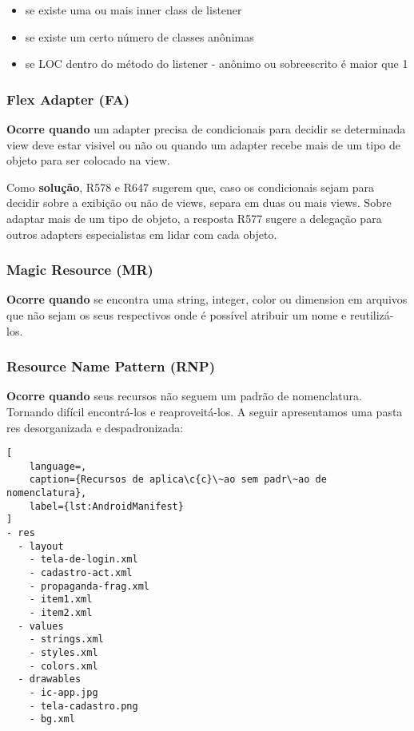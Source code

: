 \begin{itemize} 
	\item[$\circ$] [n\'ivel 4] se existe uma ou mais inner class de listener
	\item[$\circ$] [n\'ivel 3] se existe um certo n\'umero de classes an\^onimas
	\item[$\circ$] [n\'ivel 2 e 3] se LOC dentro do m\'etodo do listener - an\^onimo ou sobreescrito \'e maior que 1
\end{itemize}


\subsubsection{Flex Adapter (FA)}

\textbf{Ocorre quando} um adapter precisa de condicionais para decidir se determinada view deve estar visivel ou n\~ao ou quando um adapter recebe mais de um tipo de objeto para ser colocado na view.

Como \textbf{solu\c{c}\~ao}, R578 e R647 sugerem que, caso os condicionais sejam para decidir sobre a exibi\c{c}\~ao ou n\~ao de views, separa em duas ou mais views. Sobre adaptar mais de um tipo de objeto, a resposta R577 sugere a delega\c{c}\~ao para outros adapters especialistas em lidar com cada objeto.


\subsubsection{Magic Resource (MR)}

\textbf{Ocorre quando} se encontra uma string, integer, color ou dimension em arquivos que n\~ao sejam os seus respectivos onde \'e poss\'ivel atribuir um nome e reutiliz\'a-los. 


\subsubsection{Resource Name Pattern (RNP)}

\textbf{Ocorre quando} seus recursos n\~ao seguem um padr\~ao de nomenclatura. Tornando dif\'icil encontr\'a-los e reaproveit\'a-los. A seguir apresentamos uma pasta res desorganizada e despadronizada:

\begin{lstlisting}[
	language=, 
	caption={Recursos de aplica\c{c}\~ao sem padr\~ao de nomenclatura}, 
	label={lst:AndroidManifest}
]
- res
  - layout
    - tela-de-login.xml
    - cadastro-act.xml
    - propaganda-frag.xml
    - item1.xml
    - item2.xml
  - values
    - strings.xml 
    - styles.xml
    - colors.xml
  - drawables
    - ic-app.jpg
    - tela-cadastro.png
    - bg.xml
\end{lstlisting}

